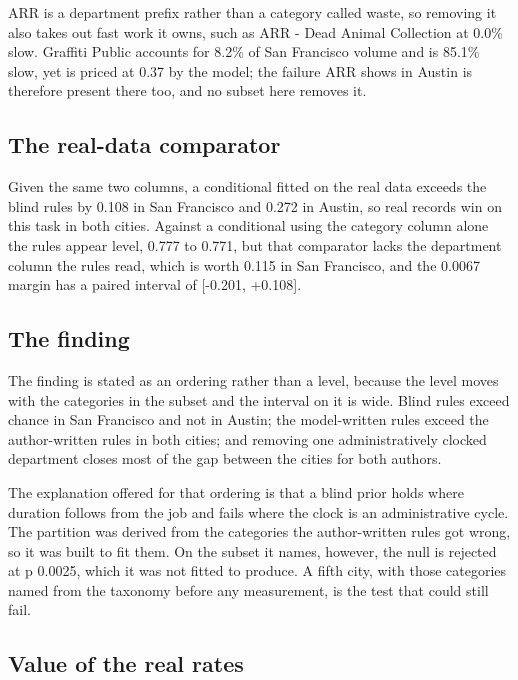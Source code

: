 \documentclass[10pt,a4paper,twocolumn]{article}
\begin{document}
ARR is a department prefix rather than a category called waste, so removing it
also takes out fast work it owns, such as ARR - Dead Animal Collection at 0.0\%
slow. Graffiti Public accounts for 8.2\% of San Francisco volume and is 85.1\%
slow, yet is priced at 0.37 by the model; the failure ARR shows in Austin is
therefore present there too, and no subset here removes it.

\subsection*{The real-data comparator}

Given the same two columns, a conditional fitted on the real data exceeds the
blind rules by 0.108 in San Francisco and 0.272 in Austin, so real records win
on this task in both cities. Against a conditional using the category column
alone the rules appear level, 0.777 to 0.771, but that comparator lacks the
department column the rules read, which is worth 0.115 in San Francisco, and the
0.0067 margin has a paired interval of [-0.201, +0.108].

\subsection*{The finding}

The finding is stated as an ordering rather than a level, because the level
moves with the categories in the subset and the interval on it is wide. Blind
rules exceed chance in San Francisco and not in Austin; the model-written rules
exceed the author-written rules in both cities; and removing one
administratively clocked department closes most of the gap between the cities
for both authors.

The explanation offered for that ordering is that a blind prior holds where
duration follows from the job and fails where the clock is an administrative
cycle. The partition was derived from the categories the author-written rules
got wrong, so it was built to fit them. On the subset it names, however, the
null is rejected at p 0.0025, which it was not fitted to produce. A fifth city,
with those categories named from the taxonomy before any measurement, is the
test that could still fail.

\subsection*{Value of the real rates}
\end{document}
